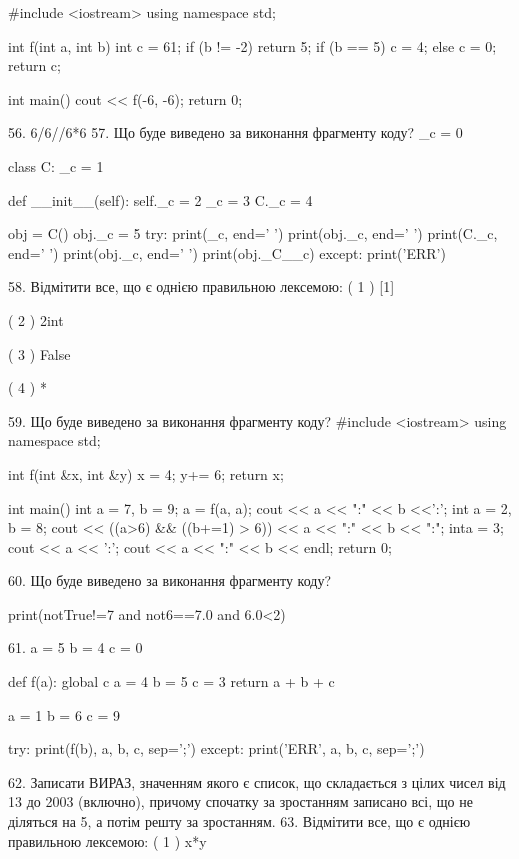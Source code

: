 \documentclass[11pt]{article}
\begin{document}
#include <iostream>
using namespace std;

int f(int a, int b){
    int c = 61;
    if (b != -2)
        return 5;
    if (b == 5)
         c = 4;
    else 
        c = 0;
    return c;
}

int main(){
    cout << f(-6, -6);
    return 0;
}

56. 
6/6//6*6
57. Що буде виведено за виконання фрагменту коду?
_c = 0

class C:
    _c = 1
    
    def __init__(self):
        self._c = 2
        _c = 3
        C._c = 4

obj = C()
obj._c = 5
try:
    print(_c, end=' ')
    print(obj._c, end=' ')
    print(C._c, end=' ')
    print(obj._c, end=' ')
    print(obj._C__c)
except:
    print('ERR')

58. %
Відмітити все, що є однією правильною лексемою:
( 1 ) [1]

( 2 ) 2int

( 3 ) False

( 4 ) *

59. Що буде виведено за виконання фрагменту коду?
#include <iostream>
using namespace std;

int f(int &x, int &y){
    x = 4;
    y+= 6;
    return x;
}

int main(){
    int a = 7, b = 9;
    a = f(a, a);
    cout << a << ":" << b <<':';
    {
        int a = 2, b = 8;
        cout << ((a>6) && ((b+=1) > 6))
             << a << ":" << b << ":";
    }
    {
        inta = 3;
        cout << a << ':';
    }
    cout << a << ":" << b << endl;
    return 0;
}


60. Що буде виведено за виконання фрагменту коду?

print(notTrue!=7 and not6==7.0 and 6.0<2)

61. 
a = 5
b = 4
c = 0

def f(a):
global c    a = 4
    b = 5
    c = 3
    return a + b + c

a = 1
b = 6
c = 9

try:
    print(f(b), a, b, c, sep=';')
except:
    print('ERR', a, b, c, sep=';')

62. 
Записати ВИРАЗ, значенням якого є список, що складається з цілих чисел від 13 до 2003 (включно), причому спочатку за зростанням записано всі, що не діляться на 5, а потім решту за зростанням.
63. %
Відмітити все, що є однією правильною лексемою:
( 1 ) x*y
\end{document}
